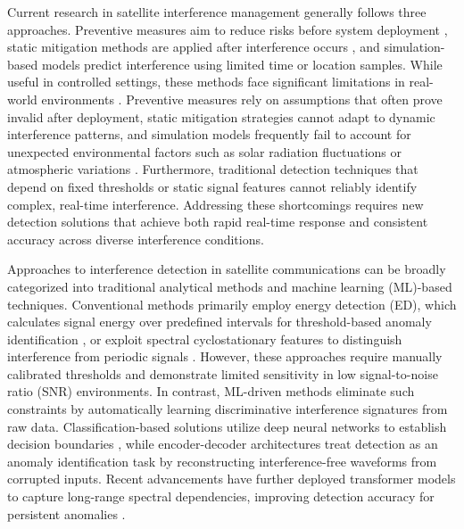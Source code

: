 \documentclass[conference]{IEEEtran}
\begin{document}
Current research in satellite interference management generally follows three approaches. Preventive measures aim to reduce risks before system deployment \cite{sharmaInlineInterferenceMitigation2016, liOptimalBeamPower2019}, static mitigation methods are applied after interference occurs \cite{wangCoFrequencyInterferenceAnalysis2020, zhangSpectralCoexistenceLEO2018}, and simulation-based models predict interference using limited time or location samples. While useful in controlled settings, these methods face significant limitations in real-world environments \cite{yunDynamicDownlinkInterference2023}. Preventive measures rely on assumptions that often prove invalid after deployment, static mitigation strategies cannot adapt to dynamic interference patterns, and simulation models frequently fail to account for unexpected environmental factors such as solar radiation fluctuations or atmospheric variations \cite{facskoSpaceWeatherEffects2023}. Furthermore, traditional detection techniques that depend on fixed thresholds or static signal features cannot reliably identify complex, real-time interference. Addressing these shortcomings requires new detection solutions that achieve both rapid real-time response and consistent accuracy across diverse interference conditions.

Approaches to interference detection in satellite communications can be broadly categorized into traditional analytical methods and machine learning (ML)-based techniques. Conventional methods primarily employ energy detection (ED), which calculates signal energy over predefined intervals for threshold-based anomaly identification \cite{kay2009fundamentals}, or exploit spectral cyclostationary features to distinguish interference from periodic signals \cite{experimentalCyclostationary}. However, these approaches require manually calibrated thresholds and demonstrate limited sensitivity in low signal-to-noise ratio (SNR) environments. In contrast, ML-driven methods eliminate such constraints by automatically learning discriminative interference signatures from raw data. Classification-based solutions utilize deep neural networks to establish decision boundaries \cite{pellacoSpectrumPredictionInterference2019}, while encoder-decoder architectures treat detection as an anomaly identification task by reconstructing interference-free waveforms from corrupted inputs. Recent advancements have further deployed transformer models to capture long-range spectral dependencies, improving detection accuracy for persistent anomalies \cite{saifaldawlaGenAIBasedModelsNGSO2024}.
\end{document}
